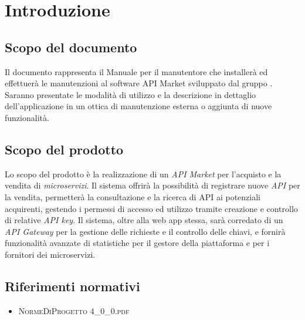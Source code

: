 \newpage
\section{Introduzione}

\subsection{Scopo del documento}
Il documento rappresenta il Manuale per il manutentore che installerà ed effettuerà le manutenzioni al software API Market sviluppato dal gruppo \gruppo. Saranno presentate le modalità di utilizzo e la descrizione in dettaglio dell'applicazione in un ottica di manutenzione esterna o aggiunta di nuove funzionalità.

\subsection{Scopo del prodotto}
Lo scopo del prodotto è la realizzazione di un \textit{API Market} per l'acquisto e la vendita di \textit{microservizi}. Il sistema offrirà la possibilità di registrare nuove \textit{API} per la vendita, permetterà la consultazione e la ricerca di API ai potenziali acquirenti, gestendo i permessi di accesso ed utilizzo tramite creazione e controllo di relative \textit{API key}. Il sistema, oltre alla web app stessa, sarà corredato di un \textit{API Gateway} per la gestione delle richieste e il controllo delle chiavi, e fornirà funzionalità avanzate di statistiche per il gestore della piattaforma e per i fornitori dei microservizi.

\subsection{Riferimenti normativi}
\begin{itemize}
	\item \textsc{NormeDiProgetto 4\_0\_0.pdf}
\end{itemize}

